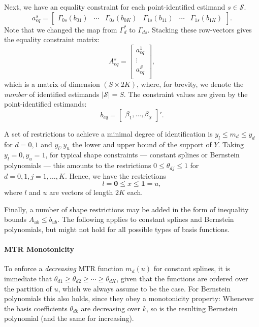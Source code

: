 \documentclass[12pt,a4paper,english]{article} %
\numberwithin{equation}{section}
\numberwithin{figure}{section}
\numberwithin{table}{section}
\begin{document}
Next, we have an equality constraint for each point-identified estimand $s\in\mathcal{S}$.
\begin{equation*}
  a_{eq}^s =
  \begin{bmatrix}
     \Gamma_{0s}(b_{01}) & \cdots & \Gamma_{0s}(b_{0K}) & \Gamma_{1s}(b_{11}) & \cdots & \Gamma_{1s}(b_{1K})
  \end{bmatrix}.
\end{equation*}
Note that we changed the map from $\Gamma^*_d$ to $\Gamma_{ds}$. Stacking these row-vectors gives the equality constraint matrix:
\begin{equation*}
  A_{eq}^s =
  \begin{bmatrix}
    a_{eq}^1 \\
    \vdots \\
    a_{eq}^\mathcal{S} \\
  \end{bmatrix},
\end{equation*}
which is a matrix of dimension $(S\times 2K)$, where, for brevity, we denote the \textit{number} of identified estimands $|\mathcal{S}| = S$.
The constraint values are given by the point-identified estimands:
\begin{equation*}
  b_{eq} =
  \begin{bmatrix}
    \beta_1, \ldots, \beta_\mathcal{S}
  \end{bmatrix}'.
\end{equation*}


A set of restrictions to achieve a minimal degree of identification is $y_l \leq m_d \leq y_d$ for $d=0,1$ and $y_l, y_u$ the lower and upper bound of the support of $Y$.
Taking $y_l = 0, y_u=1$, for typical shape constraints --- constant splines or Bernstein polynomials --- this amounts to the restrictions $0\leq \theta_{dj} \leq 1$ for $d=0,1, j=1,\ldots,K$.
Hence, we have the restrictions
\begin{equation*}
  l = \mathbf{0} \leq x \leq \mathbf{1} = u,
\end{equation*}
where $l$ and $u$ are vectors of length $2K$ each.

Finally, a number of shape restrictions may be added in the form of inequality bounds $A_{ub} \leq b_{ub}$.
The following applies to constant splines and Bernstein polynomials, but might not hold for all possible types of basis functions.

\paragraph{MTR Monotonicity}
To enforce a \textit{decreasing} MTR function $m_d(u)$ for constant splines, it is immediate that $\theta_{d1} \geq \theta_{d2} \geq \cdots \geq \theta_{dK}$, given that the functions are ordered over the partition of $u$, which we always assume to be the case.
For Bernstein polynomials this also holds, since they obey a monotonicity property: Whenever the basis coefficients $\theta_{dk}$ are decreasing over $k$, so is the resulting Bernstein polynomial (and the same for increasing).
\end{document}
